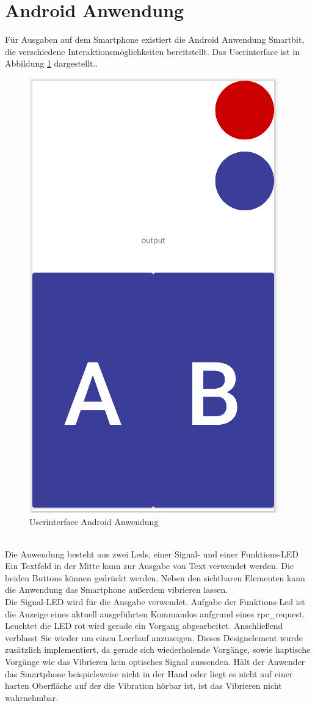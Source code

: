 \documentclass[11pt,a4paper]{report}
\begin{document}
\section{Android Anwendung}\label{sec:androidApp}
Für Ausgaben auf dem Smartphone existiert die Android Anwendung Smartbit, die verschiedene Interaktionsmöglichkeiten bereitstellt.
Das Userinterface ist in Abbildung \ref{fig:androidUI} dargestellt..
\begin{figure}[htbp]
  \centering
  \includegraphics[width=.6\textwidth]{images/android_app_ui}
  \caption{Userinterface Android Anwendung}
  \label{fig:androidUI}
\end{figure}
\\
Die Anwendung besteht aus zwei Leds, einer Signal- und einer Funktions-LED
Ein Textfeld in der Mitte kann zur Ausgabe von Text verwendet werden.
Die beiden Buttons können gedrückt werden.
Neben den sichtbaren Elementen kann die Anwendung das Smartphone außerdem vibrieren lassen.
\\
Die Signal-LED wird für die Ausgabe verwendet.
Aufgabe der Funktions-Led ist die Anzeige eines aktuell ausgeführten Kommandos aufgrund eines rpc\_request.
Leuchtet die LED rot wird gerade ein Vorgang abgearbeitet.
Anschließend verblasst Sie wieder um einen Leerlauf anzuzeigen.
Dieses Designelement wurde zusätzlich implementiert, da gerade sich wiederholende Vorgänge, sowie haptische Vorgänge wie das Vibrieren kein optisches Signal aussenden.
Hält der Anwender das Smartphone beispielsweise nicht in der Hand oder liegt es nicht auf einer harten Oberfläche auf der die Vibration hörbar ist, ist das Vibrieren nicht wahrnehmbar.
\end{document}
